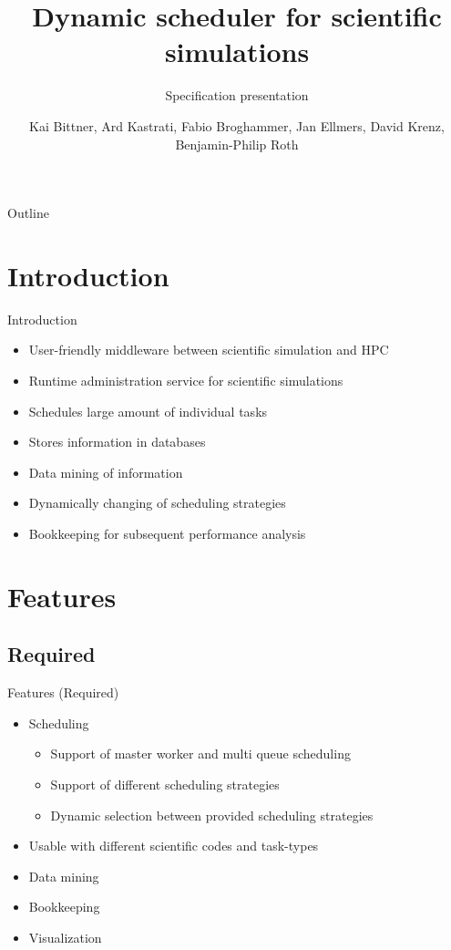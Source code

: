 \documentclass[18pt]{beamer}
\title[Specification presentation]{Dynamic scheduler for scientific simulations}
\subtitle{Specification presentation}
\author{Kai Bittner, Ard Kastrati, Fabio Broghammer, Jan Ellmers, David Krenz, Benjamin-Philip Roth}
\institute{Steinbuch Centre for Computing (SCC)}
\begin{document}

\begin{frame}
\titlepage
\end{frame}

\begin{frame}{Outline}
\tableofcontents
\end{frame}

\section{Introduction}
	\begin{frame}{Introduction}
		\begin{itemize}
			\pause
			\item User-friendly middleware between scientific simulation and HPC
			\pause
			\item Runtime administration service for scientific simulations
			\pause
			\item Schedules large amount of individual tasks
			\pause
			\item Stores information in databases
			\pause
			\item Data mining of information
			\pause
			\item Dynamically changing of scheduling strategies
			\pause
			\item Bookkeeping for subsequent performance analysis
		\end{itemize}
	\end{frame}
	
\section{Features}
	\subsection{Required}
	\begin{frame}{Features (Required)}
		\begin{itemize}
			\pause
			\item Scheduling	
				\begin{itemize}
					\item Support of master worker and multi queue scheduling
					\item Support of different scheduling strategies
					\item Dynamic selection between provided scheduling strategies
				\end{itemize}
			\pause
			\item Usable with different scientific codes and task-types
			\pause
			\item Data mining
			\pause
			\item Bookkeeping
			\pause
			\item Visualization
		\end{itemize}
	\end{frame}
	
\end{document}

